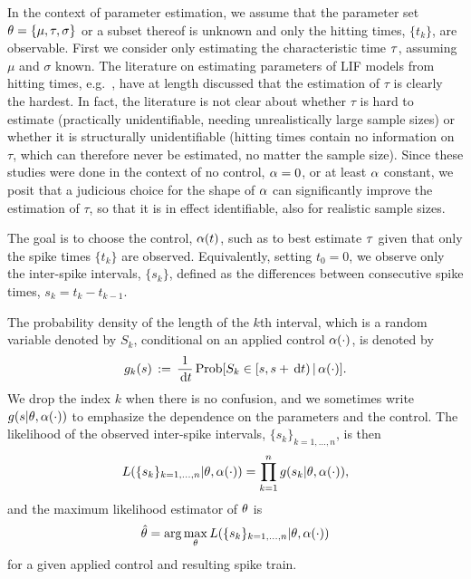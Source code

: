 \documentclass[12pt]{article}
\begin{document}
In the context of parameter estimation, we assume that the
parameter set ${\theta} = \{{\mu }, { \tau }, {\sigma }\}$ or a subset thereof is unknown and only the hitting times,
$\{t_k\}$, are observable.
First we consider only estimating the characteristic time ${ \tau }$,
assuming $\mu$ and $\sigma$ known. The literature on estimating parameters of
LIF models from hitting times, e.g.\ \cite{Ditlevsen2007,MullowneyIyengar2008}, have
at length discussed that the estimation of $\tau$ is clearly the
hardest. In fact, the literature is not clear about 
whether $\tau$ is hard to estimate (practically unidentifiable,
needing unrealistically large sample sizes) or
whether it is structurally unidentifiable (hitting times contain no
information on $\tau$, which can therefore never be estimated, no
matter the sample size). Since these studies were done in the
context of no control, ${\alpha}=0$, or at least ${\alpha}$ constant, we posit that
a judicious choice for the shape of ${\alpha}$ can significantly improve the
estimation of $\tau$, so that it is in effect identifiable, also for
realistic sample sizes.

The goal is to choose the control, ${\alpha}(t)$, such as to best estimate ${ \tau }$
given that only the spike times $\{t_k\}$ are observed. Equivalently, setting
$t_0 = 0$, we observe only the inter-spike intervals, $\{s_k\}$,
defined as the differences between consecutive spike times, $s_k = t_k - t_{k-1}$.

The probability density of the length of the $k$th interval, which is a
random variable denoted by $S_k$, conditional on an applied control ${\alpha}(\cdot)$,
is denoted by
\begin{equation} 
g_k(s) \, := \,  \frac{1}{\, \mathrm{d} t} \operatorname{Prob}[S_{k} \in [s, s + \, \mathrm{d} t)  \,|\,
 {\alpha}(\cdot)]. 
\label{eq:ISI_distribution_functions}
\end{equation}
We drop the index $k$ when there is no
confusion, and we sometimes write $g(s|{\theta}, \alpha(\cdot))$ to
emphasize the dependence on the parameters and the control. The
likelihood of the observed inter-spike intervals, $\{s_k\}_{k=1,
  \ldots , n}$, is then
\begin{equation}
L(\{s_k\}_{k=1, \ldots , n} |{\theta}, \alpha(\cdot)) = \prod_{k=1}^n g(s_k|{\theta}, \alpha(\cdot)),
\end{equation}
and the maximum likelihood estimator of ${\theta}$ is
\begin{equation}
\label{MLE}
\hat {{\theta}} = \arg \max_{{\theta}} L(\{s_k\}_{k=1, \ldots , n} |{\theta}, \alpha(\cdot)) 
\end{equation}
for a given applied control and resulting spike train.
\end{document}

